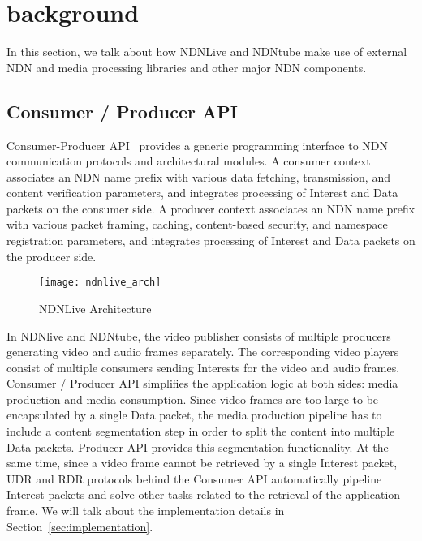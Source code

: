 \section{background} %
In this section, we talk about how NDNLive and NDNtube make use of external NDN and media processing libraries and other major NDN components. 

\label{sec:background}
\subsection{Consumer / Producer API}
\label{ssub:cpapi}
Consumer-Producer API~\cite{api-tr} provides a generic programming interface to NDN communication protocols and architectural modules. A consumer context associates an NDN name prefix with various data fetching, transmission, and content verification parameters, and integrates processing of Interest and Data packets on the consumer side. A producer context associates an NDN name prefix with various packet framing, caching, content-based security, and namespace registration parameters, and integrates processing of Interest and Data packets on the producer side.

\begin{figure*}
  \centering
  \texttt{[image: ndnlive\_arch]}
  \caption{NDNLive Architecture}
  \label{fig:ndnlive_arch}
\end{figure*}

In NDNlive and NDNtube, the video publisher consists of multiple producers generating video and audio frames separately. The corresponding video players consist of multiple consumers sending Interests for the video and audio frames. Consumer / Producer API simplifies the application logic at both sides: media production and media consumption. Since video frames are too large to be encapsulated by a single Data packet, the media production pipeline has to include a content segmentation step in order to split the content into multiple Data packets. Producer API provides this segmentation functionality. At the same time, since a video frame cannot be retrieved by a single Interest packet, UDR and RDR protocols behind the Consumer API automatically pipeline Interest packets and solve other tasks related to the retrieval of the application frame. 
We will talk about the implementation details in Section~\ref{sec:implementation}.

